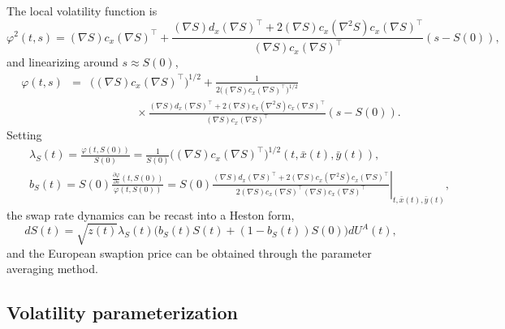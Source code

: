 \documentclass[12pt]{article}
\begin{document}
    The local volatility function is
    \begin{equation}
      \varphi^2(t,s)=(\nabla S) c_x (\nabla S)^{\top}
          + \frac{(\nabla S) d_x (\nabla S)^{\top} + 2(\nabla S) c_x (\nabla^2 S) c_x (\nabla S)^{\top}}
                 {(\nabla S) c_x (\nabla S)^{\top}}\left(s-S(0)\right),
    \end{equation}
    and linearizing around $s\approx S(0)$,
    \begin{eqnarray}
      \varphi(t,s)&=&\bigg((\nabla S) c_x (\nabla S)^{\top}\bigg)^{1/2}
                      + \frac{1}{2\bigg((\nabla S) c_x (\nabla S)^{\top}\bigg)^{1/2}}\nonumber\\
          &&\quad\quad\quad\quad \times\frac{(\nabla S) d_x (\nabla S)^{\top} + 2(\nabla S) c_x (\nabla^2 S) c_x (\nabla S)^{\top}}
                                            {(\nabla S) c_x (\nabla S)^{\top}}\left(s-S(0)\right).
      \label{expansion}
    \end{eqnarray}
    Setting
    \begin{eqnarray}
      &&\lambda_S(t)=\frac{\varphi(t,S(0))}{S(0)}=\frac{1}{S(0)}\bigg((\nabla S) c_x (\nabla S)^{\top}\bigg)^{1/2}\left(t,\bar{x}(t),\bar{y}(t)\right),\\
      &&b_S(t)=S(0)\frac{\frac{\partial\varphi}{\partial s}(t,S(0))}{\varphi(t,S(0))}
              =\left.S(0)\frac{(\nabla S) d_x (\nabla S)^{\top} + 2(\nabla S) c_x (\nabla^2 S) c_x (\nabla S)^{\top}}
                                            {2(\nabla S) c_x (\nabla S)^{\top}(\nabla S) c_x (\nabla S)^{\top}}\right|_{t,\bar{x}(t),\bar{y}(t)},
    \end{eqnarray}
    the swap rate dynamics can be recast into a Heston form,
    \begin{equation}
      dS(t)=\sqrt{z(t)}\lambda_S(t)\Big(b_S(t)S(t)+\left(1-b_S(t)\right)S(0)\Big)dU^A(t),
    \end{equation}
    and the European swaption price can be obtained through the parameter averaging method.

  \subsection{Volatility parameterization}
\end{document}
